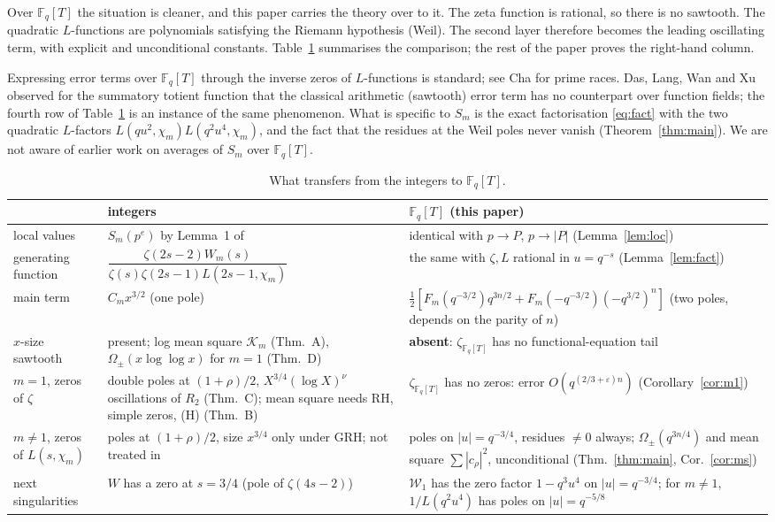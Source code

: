 \documentclass[11pt]{amsart}
\theoremstyle{remark}
\newcommand{\Fq}{\mathbb{F}_q}
\begin{document}
Over $\Fq[T]$ the situation is cleaner, and this paper carries the theory over to it. The zeta function is rational, so there is no sawtooth. The quadratic $L$-functions are polynomials satisfying the Riemann hypothesis (Weil). The second layer therefore becomes the leading oscillating term, with explicit and unconditional constants. Table~\ref{tab:cmp} summarises the comparison; the rest of the paper proves the right-hand column.

Expressing error terms over $\Fq[T]$ through the inverse zeros of $L$-functions is standard; see Cha \cite{C} for prime races. Das, Lang, Wan and Xu \cite{DLWX} observed for the summatory totient function that the classical arithmetic (sawtooth) error term has no counterpart over function fields; the fourth row of Table~\ref{tab:cmp} is an instance of the same phenomenon. What is specific to $S_m$ is the exact factorisation \eqref{eq:fact} with the two quadratic $L$-factors $L(qu^2,\chi_m)L(q^2u^4,\chi_m)$, and the fact that the residues at the Weil poles never vanish (Theorem~\ref{thm:main}). We are not aware of earlier work on averages of $S_m$ over $\Fq[T]$.

\begin{table}[h]
\small
\begin{tabular}{>{\raggedright}p{}>{\raggedright}p{}>{\raggedright\arraybackslash}p{}}
\toprule
& integers \cite{K} & $\Fq[T]$ (this paper)\\
\midrule
local values & $S_m(p^e)$ by Lemma~1 of \cite{K} & identical with $p\to P$, $p\to|P|$ (Lemma~\ref{lem:loc})\\
generating function & $\dfrac{\zeta(2s-2)W_m(s)}{\zeta(s)\zeta(2s-1)L(2s-1,\chi_m)}$ & the same with $\zeta,L$ rational in $u=q^{-s}$ (Lemma~\ref{lem:fact})\\
main term & $C_mx^{3/2}$ (one pole) & $\tfrac12[F_m(q^{-3/2})q^{3n/2}+F_m(-q^{-3/2})(-q^{3/2})^n]$ (two poles, depends on the parity of $n$)\\
$x$-size sawtooth & present; log mean square $\mathcal K_m$ (Thm.~A), $\Omega_\pm(x\log\log x)$ for $m=1$ (Thm.~D) & \textbf{absent}: $\zeta_{\Fq[T]}$ has no functional-equation tail\\
$m=1$, zeros of $\zeta$ & double poles at $(1+\rho)/2$, $X^{3/4}(\log X)^\nu$ oscillations of $R_2$ (Thm.~C); mean square needs RH, simple zeros, (H) (Thm.~B) & $\zeta_{\Fq[T]}$ has no zeros: error $O(q^{(2/3+\varepsilon)n})$ (Corollary~\ref{cor:m1})\\
$m\ne1$, zeros of $L(s,\chi_m)$ & poles at $(1+\rho)/2$, size $x^{3/4}$ only under GRH; not treated in \cite{K} & poles on $|u|=q^{-3/4}$, residues $\ne0$ always; $\Omega_\pm(q^{3n/4})$ and mean square $\sum|c_\rho|^2$, unconditional (Thm.~\ref{thm:main}, Cor.~\ref{cor:ms})\\
next singularities & $W$ has a zero at $s=3/4$ (pole of $\zeta(4s-2)$) & $\mathcal W_1$ has the zero factor $1-q^3u^4$ on $|u|=q^{-3/4}$; for $m\ne1$, $1/L(q^2u^4)$ has poles on $|u|=q^{-5/8}$\\
\bottomrule
\end{tabular}
\caption{What transfers from the integers to $\Fq[T]$.}\label{tab:cmp}
\end{table}
\end{document}
